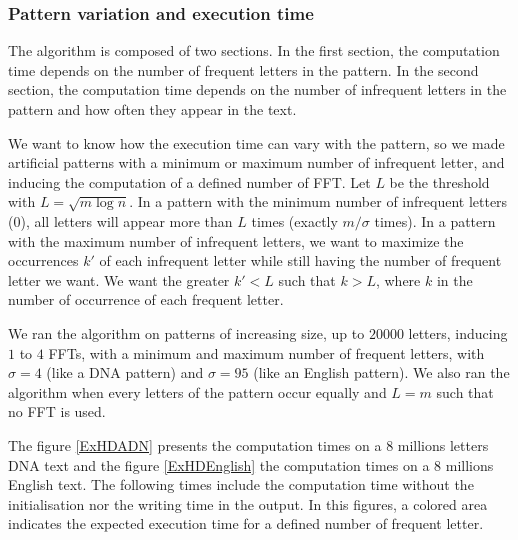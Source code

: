 \documentclass[preprint,12pt]{elsarticle}
\begin{document}
\subsubsection*{Pattern variation and execution time}

The algorithm is composed of two sections.
In the first section, the computation time depends
on the number of frequent letters in the pattern.
In the second section, the computation time depends on the number
of infrequent letters in the pattern and how often they appear in the text.

We want to know how the execution time can vary with the pattern,
so %
we made artificial patterns
with a minimum or maximum number of infrequent letter,
and inducing the computation of a defined number of FFT.
Let $L$ be the threshold with $L = \sqrt{m \log n}$.
In a pattern with the minimum number of infrequent letters ($0$),
all letters will appear more than $L$ times
(exactly $m/\sigma$ times).
In a pattern with the maximum number of infrequent letters,
we want to maximize the occurrences $k'$ of each infrequent letter
while still having the number of frequent letter we want.
We want the greater $k'<L$ such that $k > L$,
where $k$ in the number of occurrence of each frequent letter.

We ran the algorithm on patterns of increasing size, up to $20 000$ letters, inducing $1$ to $4$ FFTs,
with a minimum and maximum number of frequent letters, with $\sigma = 4$ (like a DNA pattern)
and $\sigma = 95$ (like an English pattern).
We also ran the algorithm when every letters of the pattern occur equally and $L=m$ such that no FFT is used.

The figure \ref{ExHDADN} presents the computation times on a $8$ millions letters DNA text
and the figure \ref{ExHDEnglish} the computation times on a $8$ millions English text.
The following times include the computation time without the initialisation nor the writing time in the output.
In this figures, a colored area indicates the expected execution time for a defined number of frequent letter.
\end{document}
